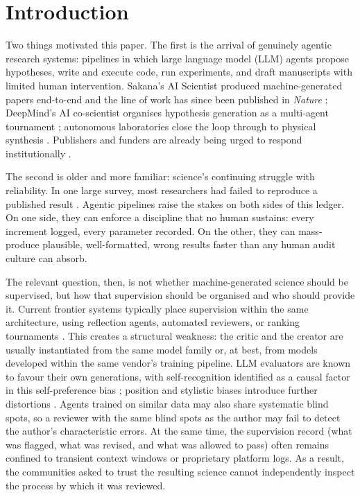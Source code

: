 \documentclass[11pt,letterpaper]{article}
\begin{document}
\section{Introduction}\label{sec:intro}

Two things motivated this paper. The first is the arrival of genuinely agentic research systems: pipelines in which large language model (LLM) agents propose hypotheses, write and execute code, run experiments, and draft manuscripts with limited human intervention. Sakana's AI Scientist produced machine-generated papers end-to-end \cite{lu2024aiscientist,yamada2025aisv2} and the line of work has since been published in \emph{Nature} \cite{lu2026nature}; DeepMind's AI co-scientist organises hypothesis generation as a multi-agent tournament \cite{gottweis2025coscientist}; autonomous laboratories close the loop through to physical synthesis \cite{boiko2023,szymanski2023}. Publishers and funders are already being urged to respond institutionally \cite{naturenews2026}.

The second is older and more familiar: science's continuing struggle with reliability. In one large survey, most researchers had failed to reproduce a published result \cite{baker2016}. Agentic pipelines raise the stakes on both sides of this ledger. On one side, they can enforce a discipline that no human sustains: every increment logged, every parameter recorded. On the other, they can mass-produce plausible, well-formatted, wrong results faster than any human audit culture can absorb.

The relevant question, then, is not whether machine-generated science should be supervised, but how that supervision should be organised and who should provide it. Current frontier systems typically place supervision within the same architecture, using reflection agents, automated reviewers, or ranking tournaments \cite{lu2024aiscientist,gottweis2025coscientist}. This creates a structural weakness: the critic and the creator are usually instantiated from the same model family or, at best, from models developed within the same vendor's training pipeline. LLM evaluators are known to favour their own generations, with self-recognition identified as a causal factor in this self-preference bias \cite{panickssery2024}; position and stylistic biases introduce further distortions \cite{zheng2023}. Agents trained on similar data may also share systematic blind spots, so a reviewer with the same blind spots as the author may fail to detect the author's characteristic errors. At the same time, the supervision record (what was flagged, what was revised, and what was allowed to pass) often remains confined to transient context windows or proprietary platform logs. As a result, the communities asked to trust the resulting science cannot independently inspect the process by which it was reviewed.
\end{document}
